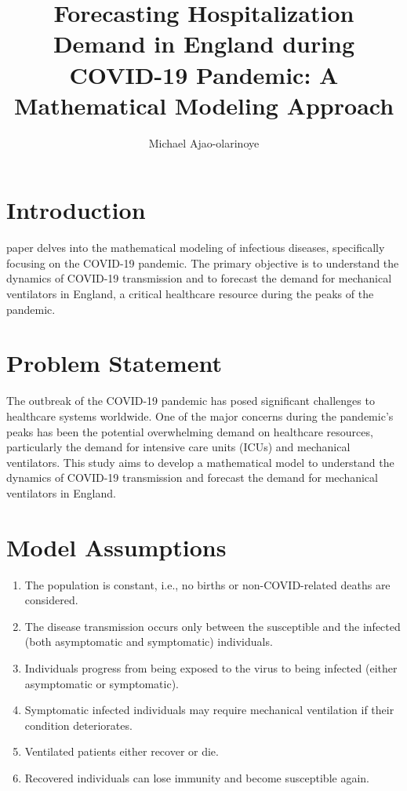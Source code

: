 \documentclass[lettersize, journal]{IEEEtran}
\begin{document}
\title{Forecasting Hospitalization Demand in England during COVID-19 Pandemic: A Mathematical Modeling Approach}
\author{Michael Ajao-olarinoye}

\maketitle


\begin{abstract}

\end{abstract}

\begin{IEEEkeywords}

\end{IEEEkeywords}

\section{Introduction}
 paper delves into the mathematical modeling of infectious diseases, specifically focusing on the COVID-19 pandemic. The primary objective is to understand the dynamics of COVID-19 transmission and to forecast the demand for mechanical ventilators in England, a critical healthcare resource during the peaks of the pandemic.

\section{Problem Statement}
The outbreak of the COVID-19 pandemic has posed significant challenges to healthcare systems worldwide. One of the major concerns during the pandemic's peaks has been the potential overwhelming demand on healthcare resources, particularly the demand for intensive care units (ICUs) and mechanical ventilators. This study aims to develop a mathematical model to understand the dynamics of COVID-19 transmission and forecast the demand for mechanical ventilators in England.

\section{Model Assumptions}
\begin{enumerate}
    \item The population is constant, i.e., no births or non-COVID-related deaths are considered.
    \item The disease transmission occurs only between the susceptible and the infected (both asymptomatic and symptomatic) individuals.
    \item Individuals progress from being exposed to the virus to being infected (either asymptomatic or symptomatic).
    \item Symptomatic infected individuals may require mechanical ventilation if their condition deteriorates.
    \item Ventilated patients either recover or die.
    \item Recovered individuals can lose immunity and become susceptible again.
\end{enumerate}
\end{document}
